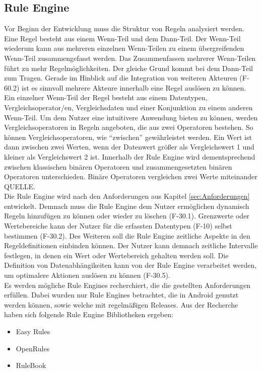 \subsection{Rule Engine}
Vor Beginn der Entwicklung muss die Struktur von Regeln analysiert werden. Eine Regel besteht aus einem Wenn-Teil und dem Dann-Teil. Der Wenn-Teil wiederum kann aus mehreren einzelnen Wenn-Teilen zu einem übergreifenden Wenn-Teil zusammengefasst werden. Das Zusammenfassen mehrerer Wenn-Teilen führt zu mehr Regelmöglichkeiten. Der gleiche Grund kommt bei dem Dann-Teil zum Tragen. Gerade im Hinblick auf die Integration von weiteren Akteuren (F-60.2) ist es sinnvoll mehrere Akteure innerhalb eine Regel auslösen zu können.\\
Ein einzelner Wenn-Teil der Regel besteht aus einem Datentypen, Vergleichsoperator/en, Vergleichsdaten und einer Konjunktion zu einem anderen Wenn-Teil. Um dem Nutzer eine intuitivere Anwendung bieten zu können, werden Vergleichsoperatoren in Regeln angeboten, die aus zwei Operatoren bestehen. So können Vergleichsoperatoren, wie ``zwischen'' gewährleistet werden. Ein Wert ist dann zwischen zwei Werten, wenn der Datenwert größer als Vergleichswert 1 und kleiner als Vergleichswert 2 ist. Innerhalb der Rule Engine wird dementsprechend zwischen klassischen binären Operatoren und zusammengesetzten binären Operatoren unterschieden. Binäre Operatoren vergleichen zwei Werte miteinander QUELLE.\\
Die Rule Engine wird nach den Anforderungen aus Kapitel \ref{sec:Anforderungen} entwickelt. Demnach muss die Rule Engine dem Nutzer ermöglichen dynamisch Regeln hinzufügen zu können oder wieder zu löschen (F-30.1). Grenzwerte oder Wertebereiche kann der Nutzer für die erfassten Datentypen (F-10) selbst bestimmen (F-30.2). Des Weiteren soll die Rule Engine zeitliche Aspekte in den Regeldefinitionen einbinden können. Der Nutzer kann demnach zeitliche Intervalle festlegen, in denen ein Wert oder Wertebereich gehalten werden soll. Die Definition von Datenabhängikeiten kann von der Rule Engine verarbeitet werden, um optimalere Aktionen auslösen zu können (F-30.5).\\
Es werden mögliche Rule Engines recherchiert, die die gestellten Anforderungen erfüllen. Dabei wurden nur Rule Engines betrachtet, die in Android genutzt werden können, sowie welche mit regelmäßigen Releases. Aus der Recherche haben sich folgende Rule Engine Bibliotheken ergeben:
\begin{itemize}                                                                                                               
	\item Easy Rules \cite{github:easyrules}
	\item OpenRules \cite{openrules}
	\item RuleBook \cite{github:rulebook}
\end{itemize}
